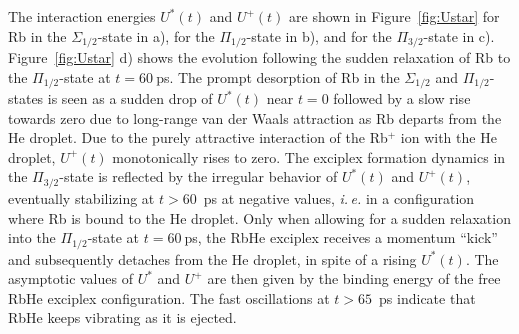 The interaction energies $U^*(t)$ and $U^+(t)$ are shown in Figure~\ref{fig:Ustar} for Rb in the $\Sigma_{1/2}$-state in a), for the $\Pi_{1/2}$-state in b), and for the $\Pi_{3/2}$-state in c). Figure~\ref{fig:Ustar} d) shows the evolution following the sudden relaxation of Rb to the  $\Pi_{1/2}$-state at $t=60~$ps. The prompt desorption of Rb in the $\Sigma_{1/2}$ and $\Pi_{1/2}$-states is seen as a sudden drop of $U^*(t)$ near $t=0$ followed by a slow rise towards zero due to long-range van der Waals attraction as Rb departs from the He droplet. Due to the purely attractive interaction of the Rb$^+$ ion with the He droplet, $U^+(t)$ monotonically rises to zero. The exciplex formation dynamics in the $\Pi_{3/2}$-state is reflected by the irregular behavior of $U^*(t)$ and $U^+(t)$, eventually stabilizing at $t>60$~ps at negative values, \textit{i.\,e.} in a configuration where Rb is bound to the He droplet. Only when allowing for a sudden relaxation into the $\Pi_{1/2}$-state at $t=60~$ps, the RbHe exciplex receives a momentum ``kick'' and subsequently detaches from the He droplet, in spite of a rising $U^*(t)$. The asymptotic values of $U^*$ and  $U^+$ are then given by the binding energy of the free RbHe exciplex configuration. The fast oscillations at $t>65$~ps indicate that RbHe keeps vibrating as it is ejected.

